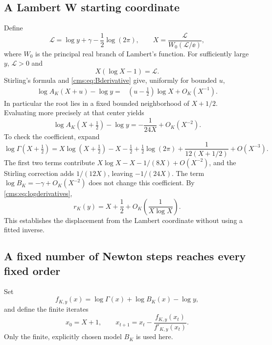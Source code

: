 \subsection{A Lambert W starting coordinate}
Define
\begin{equation}\label{cms:eq:Lambert}
\mathcal L=\log y+\gamma-\frac12\log(2\pi),\qquad
X=\frac{\mathcal L}{W_0(\mathcal L/\ee)},
\end{equation}
where $W_0$ is the principal real branch of Lambert's function. For sufficiently large $y$, $\mathcal L>0$ and
\begin{equation}\label{cms:eq:X}
X(\log X-1)=\mathcal L.
\end{equation}
Stirling's formula and \eqref{cms:eq:Bderivative} give, uniformly for bounded $u$,
\begin{align*}
\log A_K(X+u)-\log y
={}&(u-\tfrac12)\log X+O_K(X^{-1}).
\end{align*}
In particular the root lies in a fixed bounded neighborhood of $X+1/2$. Evaluating more precisely at that center yields
\begin{equation}\label{cms:eq:halfresidual}
\log A_K(X+\tfrac12)-\log y
=-\frac1{24X}+O_K(X^{-2}).
\end{equation}
To check the coefficient, expand
\[
\log\Gamma(X+\tfrac12)
=X\log(X+\tfrac12)-X-\tfrac12
 +\tfrac12\log(2\pi)+\frac1{12(X+1/2)}+O(X^{-3}).
\]
The first two terms contribute $X\log X-X-1/(8X)+O(X^{-2})$, and the Stirling correction adds $1/(12X)$, leaving $-1/(24X)$. The term $\log B_K=-\gamma+O_K(X^{-2})$ does not change this coefficient. By \eqref{cms:eq:logderivatives},
\begin{equation}\label{cms:eq:displacement}
r_K(y)=X+\frac12+O_K\!\left(\frac1{X\log X}\right).
\end{equation}
This establishes the displacement from the Lambert coordinate without using a fitted inverse.

\subsection{A fixed number of Newton steps reaches every fixed order}
Set
\begin{equation}\label{cms:eq:fNewton}
f_{K,y}(x)=\log\Gamma(x)+\log B_K(x)-\log y,
\end{equation}
and define the finite iterates
\begin{equation}\label{cms:eq:Newton}
x_0=X+1,\qquad
x_{t+1}=x_t-\frac{f_{K,y}(x_t)}{f'_{K,y}(x_t)}.
\end{equation}
Only the finite, explicitly chosen model $B_K$ is used here.

